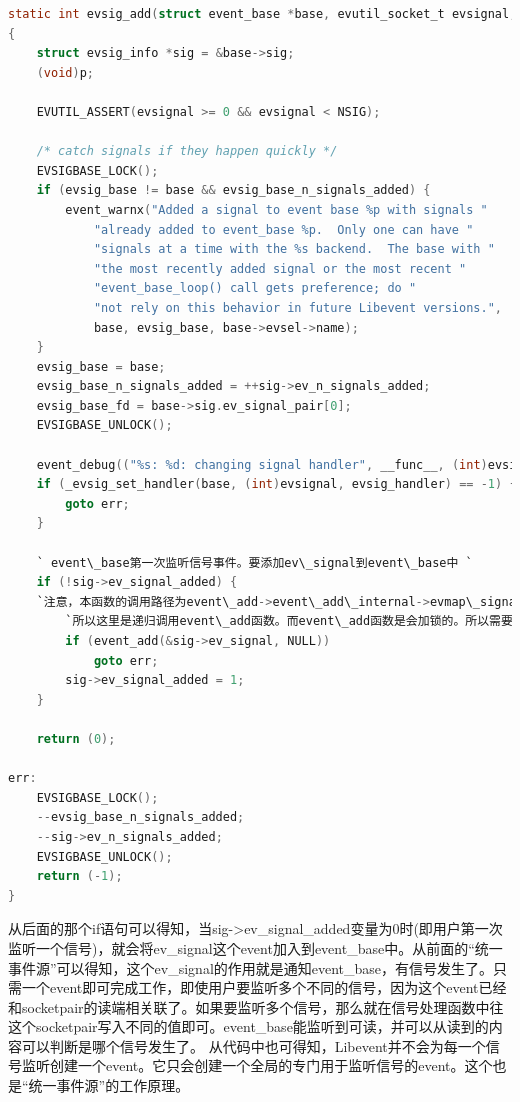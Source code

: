 \documentclass[11pt,a4paper]{article}
\begin{document}
\begin{lstlisting}[language=C]
static int evsig_add(struct event_base *base, evutil_socket_t evsignal, short old, short events, void *p)
{
	struct evsig_info *sig = &base->sig;
	(void)p;

	EVUTIL_ASSERT(evsignal >= 0 && evsignal < NSIG);

	/* catch signals if they happen quickly */
	EVSIGBASE_LOCK();
	if (evsig_base != base && evsig_base_n_signals_added) {
		event_warnx("Added a signal to event base %p with signals "
		    "already added to event_base %p.  Only one can have "
		    "signals at a time with the %s backend.  The base with "
		    "the most recently added signal or the most recent "
		    "event_base_loop() call gets preference; do "
		    "not rely on this behavior in future Libevent versions.",
		    base, evsig_base, base->evsel->name);
	}
	evsig_base = base;
	evsig_base_n_signals_added = ++sig->ev_n_signals_added;
	evsig_base_fd = base->sig.ev_signal_pair[0];
	EVSIGBASE_UNLOCK();

	event_debug(("%s: %d: changing signal handler", __func__, (int)evsignal));
	if (_evsig_set_handler(base, (int)evsignal, evsig_handler) == -1) {
		goto err;
	}

	` event\_base第一次监听信号事件。要添加ev\_signal到event\_base中 `
	if (!sig->ev_signal_added) {
	`注意，本函数的调用路径为event\_add->event\_add\_internal->evmap\_signal\_map->evsig\_add`
        `所以这里是递归调用event\_add函数。而event\_add函数是会加锁的。所以需要锁为递归锁`
		if (event_add(&sig->ev_signal, NULL))
			goto err;
		sig->ev_signal_added = 1;
	}

	return (0);

err:
	EVSIGBASE_LOCK();
	--evsig_base_n_signals_added;
	--sig->ev_n_signals_added;
	EVSIGBASE_UNLOCK();
	return (-1);
}
\end{lstlisting}
从后面的那个if语句可以得知，当sig->ev\_signal\_added变量为0时(即用户第一次监听一个信号)，就会将ev\_signal这个event加入到event\_base中。从前面的“统一事件源”可以得知，这个ev\_signal的作用就是通知event\_base，有信号发生了。只需一个event即可完成工作，即使用户要监听多个不同的信号，因为这个event已经和socketpair的读端相关联了。如果要监听多个信号，那么就在信号处理函数中往这个socketpair写入不同的值即可。event\_base能监听到可读，并可以从读到的内容可以判断是哪个信号发生了。
从代码中也可得知，Libevent并不会为每一个信号监听创建一个event。它只会创建一个全局的专门用于监听信号的event。这个也是“统一事件源”的工作原理。
\end{document}
